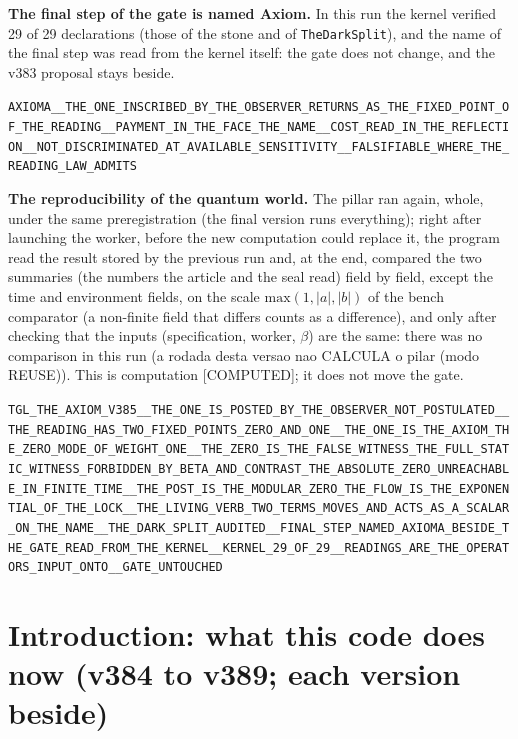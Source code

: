 \documentclass[11pt]{article}
\theoremstyle{definition}\newtheorem{deriv}{Derivation}
\begin{document}
\textbf{The final step of the gate is named Axiom.} In this run the kernel verified 29 of 29 declarations (those of the stone and of \texttt{TheDarkSplit}), and the name of the final step was read from the kernel itself: the gate does not change, and the v383 proposal stays beside.

\begin{center}\small\texttt{AXIOMA\_\_THE\_ONE\_INSCRIBED\_BY\_THE\_OBSERVER\_RETURNS\_AS\_THE\_FIXED\_POINT\_OF\_THE\_READING\_\_PAYMENT\_IN\_THE\_FACE\_THE\_NAME\_\_COST\_READ\_IN\_THE\_REFLECTION\_\_NOT\_DISCRIMINATED\_AT\_AVAILABLE\_SENSITIVITY\_\_FALSIFIABLE\_WHERE\_THE\_READING\_LAW\_ADMITS}\end{center}

\textbf{The reproducibility of the quantum world.} The pillar ran again, whole, under the same preregistration (the final version runs everything); right after launching the worker, before the new computation could replace it, the program read the result stored by the previous run and, at the end, compared the two summaries (the numbers the article and the seal read) field by field, except the time and environment fields, on the scale $\mathrm{max}(1,|a|,|b|)$ of the bench comparator (a non-finite field that differs counts as a difference), and only after checking that the inputs (specification, worker, $\beta$) are the same: there was no comparison in this run (a rodada desta versao nao CALCULA o pilar (modo REUSE)). This is computation \textsf{[COMPUTED]}; it does not move the gate.

\begin{center}\small\texttt{TGL\_THE\_AXIOM\_V385\_\_THE\_ONE\_IS\_POSTED\_BY\_THE\_OBSERVER\_NOT\_POSTULATED\_\_THE\_READING\_HAS\_TWO\_FIXED\_POINTS\_ZERO\_AND\_ONE\_\_THE\_ONE\_IS\_THE\_AXIOM\_THE\_ZERO\_MODE\_OF\_WEIGHT\_ONE\_\_THE\_ZERO\_IS\_THE\_FALSE\_WITNESS\_THE\_FULL\_STATIC\_WITNESS\_FORBIDDEN\_BY\_BETA\_AND\_CONTRAST\_THE\_ABSOLUTE\_ZERO\_UNREACHABLE\_IN\_FINITE\_TIME\_\_THE\_POST\_IS\_THE\_MODULAR\_ZERO\_THE\_FLOW\_IS\_THE\_EXPONENTIAL\_OF\_THE\_LOCK\_\_THE\_LIVING\_VERB\_TWO\_TERMS\_MOVES\_AND\_ACTS\_AS\_A\_SCALAR\_ON\_THE\_NAME\_\_THE\_DARK\_SPLIT\_AUDITED\_\_FINAL\_STEP\_NAMED\_AXIOMA\_BESIDE\_THE\_GATE\_READ\_FROM\_THE\_KERNEL\_\_KERNEL\_29\_OF\_29\_\_READINGS\_ARE\_THE\_OPERATORS\_INPUT\_ONTO\_\_GATE\_UNTOUCHED}\end{center}

\section*{Introduction: what this code does now (v384 to v389; each version beside)}
\end{document}
